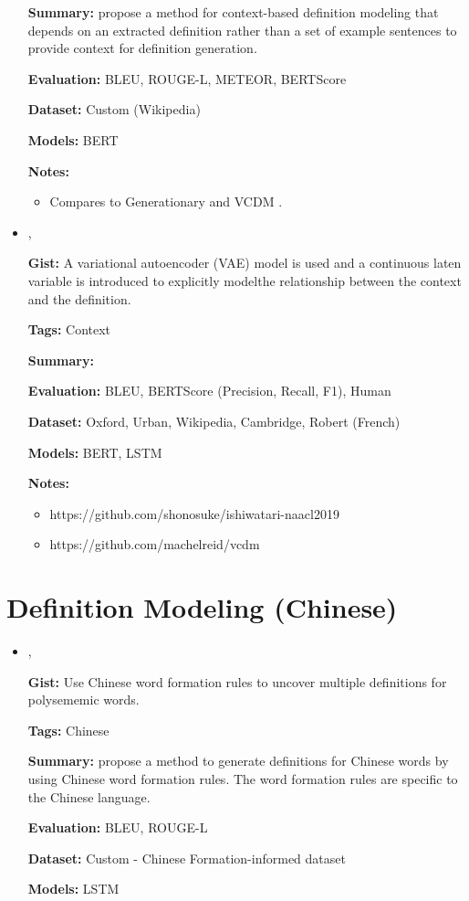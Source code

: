 \documentclass{article}[a4paper]
\newcommand{\bitem}[2]{
    \item[\cite{#1}]
        \textbf{\citetitle{#1}}

        \citeauthor{#1}, \citeyear{#1}
        \newline\newline
        {#2}
}%
\begin{document}
\begin{itemize}
{        \textbf{Summary:}
        \citeauthor{huang_cdm_2021} propose a method for context-based
        definition modeling that depends on an extracted definition rather than
        a set of example sentences to provide context for definition generation.

        \textbf{Evaluation:}
        BLEU, ROUGE-L, METEOR, BERTScore

        \textbf{Dataset:}
        Custom (Wikipedia)

        \textbf{Models:}
        BERT

        \textbf{Notes:}
        \begin{itemize}
            \item Compares to Generationary \cite{bevilacqua_generationary_2020}
                  and VCDM \cite{reid_vcdm_2020}.
        \end{itemize}
    }%

    \bitem{reid_vcdm_2020}%
    {%
        \textbf{Gist:}
        A variational autoencoder (VAE) model is used and a continuous laten
        variable is introduced to explicitly modelthe relationship between the
        context and the definition.

        \textbf{Tags:}
        Context

        \textbf{Summary:}

        \textbf{Evaluation:}
        BLEU, BERTScore (Precision, Recall, F1), Human

        \textbf{Dataset:}
        Oxford, Urban, Wikipedia, Cambridge, Robert (French)

        \textbf{Models:}
        BERT, LSTM

        \textbf{Notes:}
        \begin{itemize}
            \item https://github.com/shonosuke/ishiwatari-naacl2019
            \item https://github.com/machelreid/vcdm
        \end{itemize}
    }%
\end{itemize}

\section{Definition Modeling (Chinese)}
\begin{itemize}
    \bitem{zheng_decompose_2021}%
    {%
        \textbf{Gist:}
        Use Chinese word formation rules to uncover multiple definitions for
        polysememic words.

        \textbf{Tags:}
        Chinese

        \textbf{Summary:}
        \citeauthor{zheng_decompose_2021} propose a method to generate definitions for
        Chinese words by using Chinese word formation rules. The word formation
        rules are specific to the Chinese language.

        \textbf{Evaluation:}
        BLEU, ROUGE-L

        \textbf{Dataset:}
        Custom - Chinese Formation-informed dataset

        \textbf{Models:}
        LSTM
    }%
\end{itemize}
\end{document}
